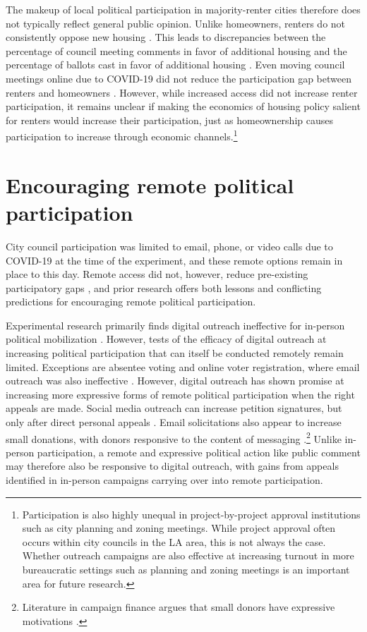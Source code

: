 \documentclass[12pt,final,fleqn]{article}
\theoremstyle{plain}
\begin{document}
The makeup of local political participation in majority-renter cities therefore does not typically reflect general public opinion. Unlike homeowners, renters do not consistently oppose new housing \citep{marble2021self, hankinson2018renters, monkkonen2019opposition}.  This leads to discrepancies between the percentage of council meeting comments in favor of additional housing and the percentage of ballots cast in favor of additional housing \citep{einstein2019participates}. Even moving council meetings online due to COVID-19 did not reduce the participation gap between renters and homeowners  \citep{einstein2021zoom}. However, while increased access did not increase renter participation, it remains unclear if making the economics of housing policy salient for renters would increase their participation, just as homeownership causes participation to increase through economic channels.\footnote{Participation is also highly unequal in project-by-project approval institutions such as city planning and zoning meetings. While project approval often occurs within city councils in the LA area, this is not always the case. Whether outreach campaigns are also effective at increasing turnout in more bureaucratic settings such as planning and zoning meetings is an important area for future research.} 


\section{Encouraging remote political participation}\label{theory: renters}


City council participation was limited to email, phone, or video calls due to COVID-19 at the time of the experiment, and these remote options remain in place to this day. Remote access did not, however, reduce pre-existing participatory gaps \citep{einstein2021zoom}, and prior research offers both lessons and conflicting predictions for encouraging remote political participation. 

Experimental research primarily finds digital outreach ineffective for in-person political mobilization \citep{green2019get}. However, tests of the efficacy of digital outreach at increasing political participation that can itself be conducted remotely remain limited. Exceptions are absentee voting and online voter registration, where email outreach was also ineffective \citep{nickerson2007does}. However, digital outreach has shown promise at increasing more expressive forms of remote political participation when the right appeals are made. Social media outreach can increase petition signatures, but only after direct personal appeals \citep{coppock2016treatments}. Email solicitations also appear to increase small donations, with donors responsive to the content of messaging \citep{gaynor2021small}.\footnote{Literature in campaign finance argues that small donors have expressive motivations \citep{ansolabehere2003there, huddy2015expressive, shieh2010individual}.} Unlike in-person participation, a remote and expressive political action like public comment may therefore also be responsive to digital outreach, with gains from appeals identified in in-person campaigns carrying over into remote participation. 
\end{document}
